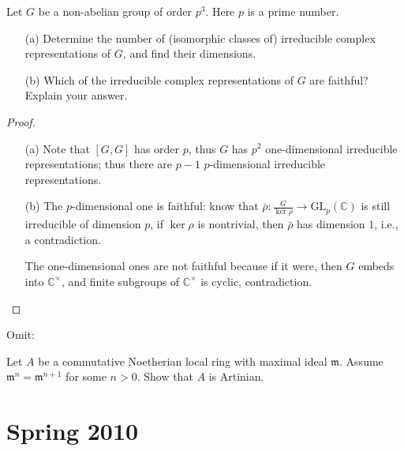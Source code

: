 \documentclass[openany]{book}
\newcommand{\C}{\mathbb{C}}
\begin{document}
\begin{prob}
    Let \(G\) be a non-abelian group of order \(p^3\). Here \(p\) is a prime number.
    \begin{itemize}
        \item[(a)] Determine the number of (isomorphic classes of) irreducible complex representations of \(G\), and find their dimensions.
        \item[(b)] Which of the irreducible complex representations of \(G\) are faithful? Explain your answer.
    \end{itemize}
\end{prob}
\begin{proof}
    \begin{itemize}
        \item[(a)] Note that $[G,G]$ has order $p$, thus $G$ has $p^2$ one-dimensional irreducible representations; thus there are $p-1$ $p$-dimensional irreducible representations.
        \item[(b)] The $p$-dimensional one is faithful: know that $\bar{\rho}:\frac{G}{\ker\rho}\to\text{GL}_p(\C)$ is still irreducible of dimension $p$, if $\ker\rho$ is nontrivial, then $\bar{\rho}$ has dimension $1$, i.e., a contradiction. 
        
        The one-dimensional ones are not faithful because if it were, then $G$ embeds into $\C^\times$, and finite subgroups of $\C^\times$ is cyclic, contradiction.
    \end{itemize}
\end{proof}



Omit:

\begin{prob}
    Let \(A\) be a commutative Noetherian local ring with maximal ideal \(\mathfrak{m}\). Assume \(\mathfrak{m}^n = \mathfrak{m}^{n+1}\) for some \(n > 0\). Show that \(A\) is Artinian.
\end{prob}








\chapter{Spring 2010}
\end{document}
